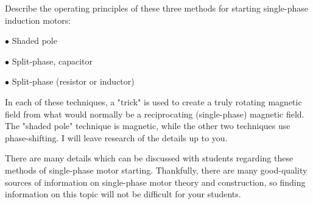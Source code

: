 

Describe the operating principles of these three methods for starting single-phase induction motors:

\medskip
\item{$\bullet$} Shaded pole
\item{$\bullet$} Split-phase, capacitor
\item{$\bullet$} Split-phase (resistor or inductor)
\medskip







In each of these techniques, a "trick" is used to create a truly rotating magnetic field from what would normally be a reciprocating (single-phase) magnetic field.  The "shaded pole" technique is magnetic, while the other two techniques use phase-shifting.  I will leave research of the details up to you.







There are many details which can be discussed with students regarding these methods of single-phase motor starting.  Thankfully, there are many good-quality sources of information on single-phase motor theory and construction, so finding information on this topic will not be difficult for your students.




